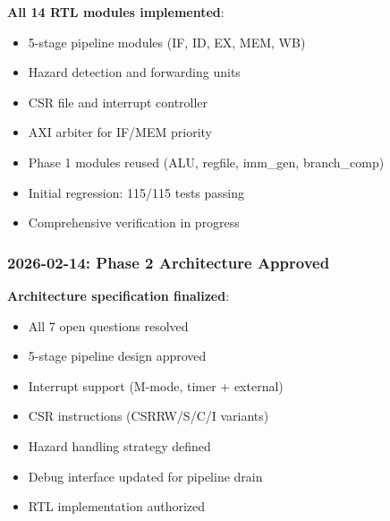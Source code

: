 \begin{record}

\textbf{All 14 RTL modules implemented}:

\begin{itemize}
\tightlist
\item
  \ok{} 5-stage pipeline modules (IF, ID, EX, MEM, WB)
\item
  \ok{} Hazard detection and forwarding units
\item
  \ok{} CSR file and interrupt controller
\item
  \ok{} AXI arbiter for IF/MEM priority
\item
  \ok{} Phase 1 modules reused (ALU, regfile, imm\_gen,
  branch\_\allowbreak{}comp)
\item
  \ok{} Initial regression: 115/115 tests passing
\item
  \wip{} Comprehensive verification in progress
\end{itemize}

\end{record}

\subsubsection{\texorpdfstring{2026-02-14: Phase 2 Architecture Approved
\ok{}}{2026-02-14: Phase 2 Architecture Approved }}\label{cr:status:phase-status:2026-02-14-phase-2-architecture-approved-tada}

\begin{record}

\textbf{Architecture specification finalized}:

\begin{itemize}
\tightlist
\item
  \ok{} All 7 open questions resolved
\item
  \ok{} 5-stage pipeline design approved
\item
  \ok{} Interrupt support (M-mode, timer + external)
\item
  \ok{} CSR instructions
  (CSRRW/\allowbreak{}S/\allowbreak{}C/\allowbreak{}I variants)
\item
  \ok{} Hazard handling strategy defined
\item
  \ok{} Debug interface updated for pipeline drain
\item
  \ok{} RTL implementation authorized
\end{itemize}

\end{record}

